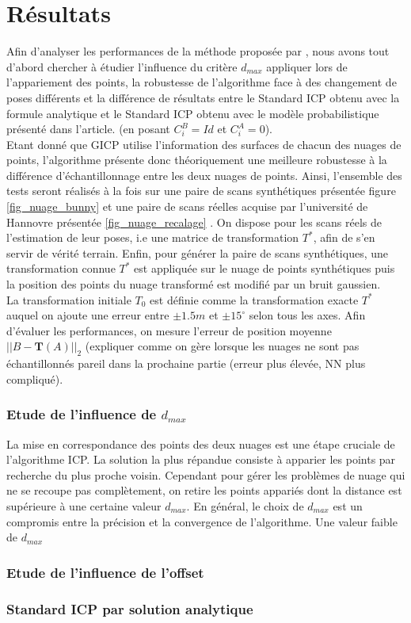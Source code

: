 \section{Résultats}
\label{chap_results}

Afin d'analyser les performances de la méthode proposée par \cite{bib_gicp}, nous avons tout d'abord chercher à étudier l'influence du critère $d_{max}$ appliquer lors de l'appariement des points, la robustesse de l'algorithme face à des changement de poses différents et la différence de résultats entre le Standard ICP obtenu avec la formule analytique et le Standard ICP obtenu avec le modèle probabilistique présenté dans l'article. (en posant $C_{i}^B=Id$ et $C_{i}^A=0$).\\

Etant donné que GICP utilise l'information des surfaces de chacun des nuages de points, l'algorithme présente donc théoriquement une meilleure robustesse à la différence d'échantillonnage entre les deux nuages de points. Ainsi, l'ensemble des tests seront réalisés à la fois sur une paire de scans synthétiques présentée figure \ref{fig_nuage_bunny} et une paire de scans réelles acquise par l'université de Hannovre présentée \ref{fig_nuage_recalage} . On dispose pour les scans réels de l'estimation de leur poses, i.e une matrice de transformation $T^*$, afin de s'en servir de vérité terrain. Enfin, pour générer la paire de scans synthétiques, une transformation connue $T^{*}$ est appliquée sur le nuage de points synthétiques puis la position des points du nuage transformé est modifié par un bruit gaussien.\\

La transformation initiale $T_0$ est définie comme la transformation exacte $T^*$ auquel on ajoute une erreur entre $\pm1.5m$ et $\pm15^{\circ}$ selon tous les axes. Afin d'évaluer les performances, on mesure l'erreur de position moyenne $||B - \mathbf{T}(A)||_2$ (expliquer comme on gère lorsque les nuages ne sont pas échantillonnés pareil dans la prochaine partie (erreur plus élevée, NN plus compliqué). 
\subsubsection{Etude de l'influence de $d_{max}$}
La mise en correspondance des points des deux nuages est une étape cruciale de l'algorithme ICP. La solution la plus répandue consiste à apparier les points par recherche du plus proche voisin. Cependant pour gérer les problèmes de nuage qui ne se recoupe pas complètement, on retire les points appariés dont la distance est supérieure à une certaine valeur $d_{max}$. En général, le choix de $d_{max}$ est un compromis entre la précision et la convergence de l'algorithme. Une valeur faible de $d_{max}$
\subsubsection{Etude de l'influence de l'offset}
\subsubsection{Standard ICP par solution analytique}